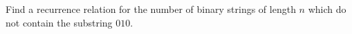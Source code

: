 %
%

%


\begin{prob}
Find a recurrence relation for the number of binary strings of length $n$ which do not contain the substring $010$.
\end{prob}
%
%
%
%
%
%

